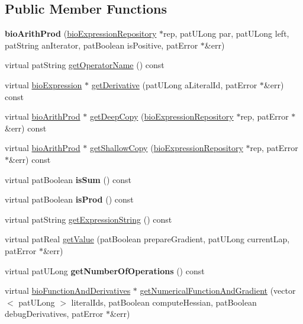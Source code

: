 \subsection*{Public Member Functions}
\begin{DoxyCompactItemize}
\item 
\mbox{\label{classbio_arith_prod_a099b149adeaee35d97c8cf8be536187d}} 
{\bfseries bio\+Arith\+Prod} (\hyperlink{classbio_expression_repository}{bio\+Expression\+Repository} $\ast$rep, pat\+U\+Long par, pat\+U\+Long left, pat\+String an\+Iterator, pat\+Boolean is\+Positive, pat\+Error $\ast$\&err)
\item 
virtual pat\+String \hyperlink{classbio_arith_prod_a9157df784bda1e1ad425de27e05804b1}{get\+Operator\+Name} () const
\item 
virtual \hyperlink{classbio_expression}{bio\+Expression} $\ast$ \hyperlink{classbio_arith_prod_a1b086a865acfc23f3cd51566eaef8ddc}{get\+Derivative} (pat\+U\+Long a\+Literal\+Id, pat\+Error $\ast$\&err) const
\item 
virtual \hyperlink{classbio_arith_prod}{bio\+Arith\+Prod} $\ast$ \hyperlink{classbio_arith_prod_a55008811df00e22759086f4983362a26}{get\+Deep\+Copy} (\hyperlink{classbio_expression_repository}{bio\+Expression\+Repository} $\ast$rep, pat\+Error $\ast$\&err) const
\item 
virtual \hyperlink{classbio_arith_prod}{bio\+Arith\+Prod} $\ast$ \hyperlink{classbio_arith_prod_a8b4a3f836dc162ea067da896093c5f38}{get\+Shallow\+Copy} (\hyperlink{classbio_expression_repository}{bio\+Expression\+Repository} $\ast$rep, pat\+Error $\ast$\&err) const
\item 
\mbox{\label{classbio_arith_prod_a87ccb533073f5f37f5eb19280275f2cb}} 
virtual pat\+Boolean {\bfseries is\+Sum} () const
\item 
\mbox{\label{classbio_arith_prod_a41ee5a7a988ca881666825762aafdbe8}} 
virtual pat\+Boolean {\bfseries is\+Prod} () const
\item 
virtual pat\+String \hyperlink{classbio_arith_prod_a665209a40bfb01098c5ddde204900294}{get\+Expression\+String} () const
\item 
virtual pat\+Real \hyperlink{classbio_arith_prod_a566bd383683dcd49930df1a1e5284918}{get\+Value} (pat\+Boolean prepare\+Gradient, pat\+U\+Long current\+Lap, pat\+Error $\ast$\&err)
\item 
\mbox{\label{classbio_arith_prod_ab8151bb2d88725408d333b151961a5c7}} 
virtual pat\+U\+Long {\bfseries get\+Number\+Of\+Operations} () const
\item 
virtual \hyperlink{classbio_function_and_derivatives}{bio\+Function\+And\+Derivatives} $\ast$ \hyperlink{classbio_arith_prod_a6f7d57d9c0ec86aed9bb7eb643beb44e}{get\+Numerical\+Function\+And\+Gradient} (vector$<$ pat\+U\+Long $>$ literal\+Ids, pat\+Boolean compute\+Hessian, pat\+Boolean debug\+Derivatives, pat\+Error $\ast$\&err)
\end{DoxyCompactItemize}
